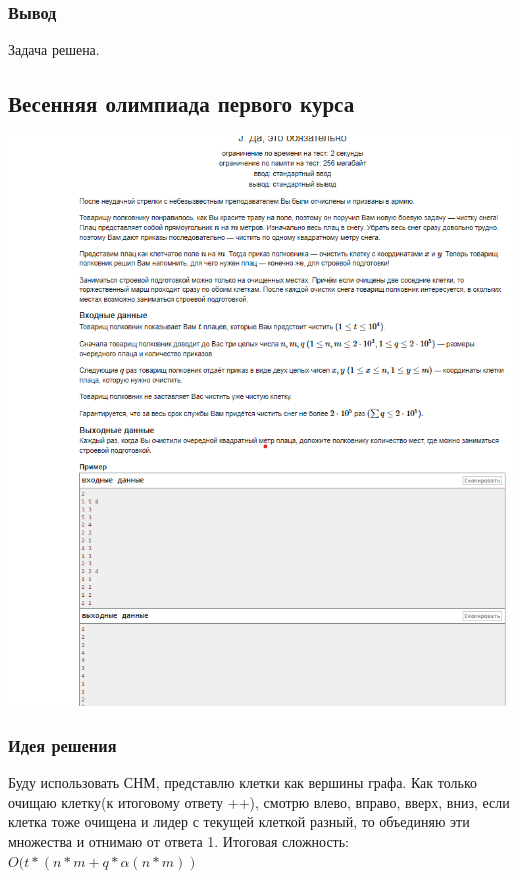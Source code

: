 \subsubsection*{Вывод}
Задача решена.

\vspace{20pt}

\pagebreak


\subsection*{Весенняя олимпиада первого курса}
\begin{center}
\includegraphics[width=\textwidth]{statements/23.png}
\end{center}
\subsubsection*{Идея решения}
Буду использовать СНМ, представлю клетки как вершины графа. Как только очищаю клетку(к итоговому ответу ++), смотрю влево, вправо, вверх, вниз, если клетка тоже очищена и лидер с текущей клеткой разный, то объединяю эти множества и отнимаю от ответа 1.
Итоговая сложность: $O(t*(n*m + q*\alpha(n*m))$
